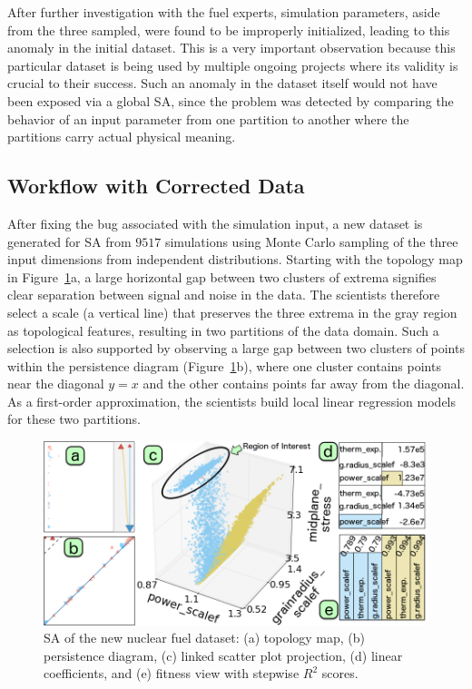 After further investigation with the fuel experts, simulation parameters, aside from the three sampled, were found to be improperly initialized, leading to this anomaly in the initial dataset.
%
This is a very important observation because this particular dataset is being used by multiple ongoing projects where its validity is crucial to their success.
%
%
Such an anomaly in the dataset itself would not have been exposed via a global SA, since the problem was detected by comparing the behavior of an input parameter from one partition to another where the partitions carry actual physical meaning.

\subsection{Workflow with Corrected Data}
\label{sec:workflow}
After fixing the bug associated with the simulation input, a new dataset is generated for SA from $9517$ simulations using Monte Carlo sampling of the three input dimensions from independent distributions.
%
Starting with the topology map in Figure~\ref{fig:bison}a, a large horizontal gap between two clusters of extrema signifies clear separation between signal and noise in the data.
%
The scientists therefore select a scale (a vertical line) that preserves the three extrema in the gray region as topological features, resulting in two partitions of the data domain.
%
Such a selection is also supported by observing a large gap between two clusters of points within the persistence diagram (Figure~\ref{fig:bison}b), where one cluster contains points near the diagonal $y=x$ and the other contains points far away from the diagonal.
%
As a first-order approximation, the scientists build local linear regression models for these two partitions.

\begin{figure}[b]
  \centering
  \includegraphics[width=.48\textwidth]{figs/chap6/bison2}
  \caption{SA of the new nuclear fuel dataset:
  (a) topology map, (b) persistence diagram, (c) linked scatter plot projection,  (d) linear coefficients, and (e) fitness view with stepwise $R^2$ scores.
  }
  \label{fig:bison}
\end{figure}

